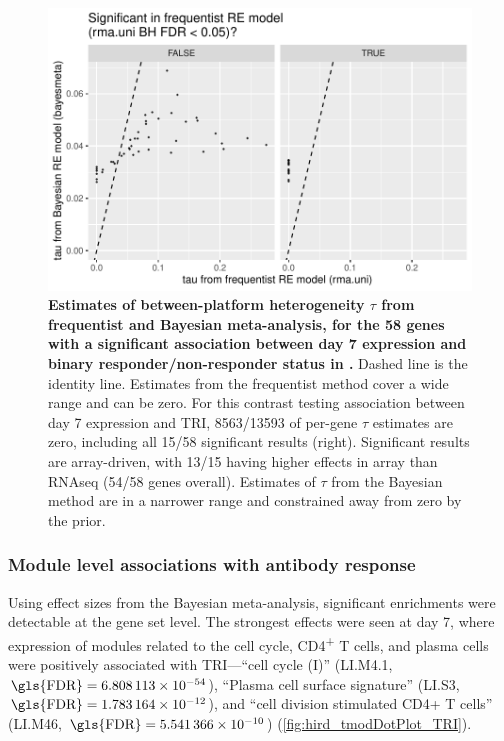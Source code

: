 \begin{figure}
    \includegraphics[width=1.0\textwidth,page=1]{mainmatter/figures/chapter_02/plot_dge_eqtl.DGE.sobolev2016_d7R.vs.d7NR.tauComparison.pdf}
    \caption{
        \textbf{Estimates of between-platform heterogeneity $\tau$ from frequentist and Bayesian meta-analysis, for the 58 genes with a significant association between day 7 expression and binary responder/non-responder status in \textcite{sobolev2016AdjuvantedInfluenzaH1N1Vaccination}.}
        Dashed line is the identity line.
        Estimates from the frequentist method cover a wide range and can be zero.
        For this contrast testing association between day 7 expression and \gls{TRI}, \num{8563/13593} of per-gene $\tau$ estimates are zero,
        including all 15/58 significant results (right).
        Significant results are array-driven, with 13/15 having higher effects in array than \gls{RNAseq} (54/58 genes overall).
        Estimates of $\tau$ from the Bayesian method are in a narrower range and constrained away from zero by the prior.
    }
    \label{fig:hird_DGE_sobolev2016hits_tauComparison}
\end{figure}

\subsubsection{Module level associations with antibody response}

Using effect sizes from the Bayesian meta-analysis,
significant enrichments were detectable at the gene set level.
The strongest effects were seen at day 7, where expression of modules related to the cell cycle, CD4\textsuperscript{+} T cells, and plasma cells were positively associated with \gls{TRI}---\enquote{cell cycle (I)} (LI.M4.1, $\text{\gls{FDR}} = \num{6.808113e-54}$),
\enquote{Plasma cell surface signature} (LI.S3, $\text{\gls{FDR}} = \num{1.783164e-12}$),
and \enquote{cell division stimulated CD4+ T cells} (LI.M46, $\text{\gls{FDR}} = \num{5.541366e-10}$) (\cref{fig:hird_tmodDotPlot_TRI}).

